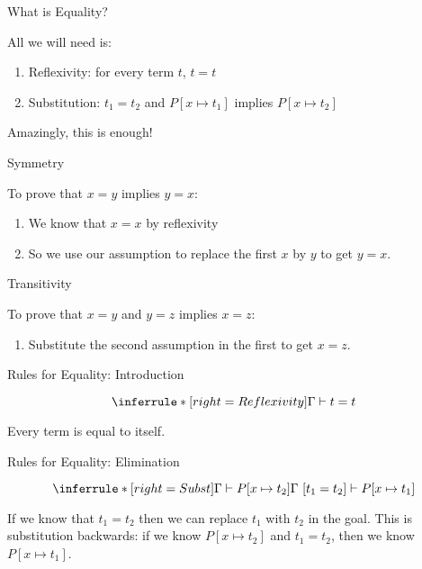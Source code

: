 \documentclass[xetex,aspectratio=169,14pt,hyperref={pdfpagelabels=true,pdflang={en-GB}}]{beamer}
\begin{document}
\begin{frame}
  {What is Equality?}

  All we will need is:
  \begin{enumerate}
  \item Reflexivity: for every term $t$, $t = t$
  \item Substitution: $t_1 = t_2$ and $P[x \mapsto t_1]$ implies $P[x \mapsto t_2]$
  \end{enumerate}

  \bigskip

  Amazingly, this is enough!
\end{frame}

\begin{frame}
  {Symmetry}

  To prove that $x = y$ implies $y = x$:
  \begin{enumerate}
  \item We know that $x = x$ by reflexivity
  \item So we use our assumption to replace the first $x$ by $y$ to get $y = x$.
  \end{enumerate}
\end{frame}

\begin{frame}
  {Transitivity}

  To prove that $x = y$ and $y = z$ implies $x = z$:
  \begin{enumerate}
  \item Substitute the second assumption in the first to get $x = z$.
  \end{enumerate}
\end{frame}

\begin{frame}
  {Rules for Equality: Introduction}

  \begin{displaymath}
    \inferrule* [right=Reflexivity]
    { }
    {\Gamma \vdash t = t}
  \end{displaymath}

  \bigskip

  Every term is equal to itself.
\end{frame}

\begin{frame}
  {Rules for Equality: Elimination}

  \begin{displaymath}
    \inferrule* [right=Subst]
    {\Gamma \vdash P[x \mapsto t_2]}
    {\Gamma~[t_1 = t_2] \vdash P[x \mapsto t_1]}
  \end{displaymath}

  If we know that $t_1 = t_2$ then we can replace $t_1$ with $t_2$ in
  the goal. This is substitution backwards: if we know
  $P[x \mapsto t_2]$ and $t_1 = t_2$, then we know $P[x \mapsto t_1]$.
\end{frame}
\end{document}
